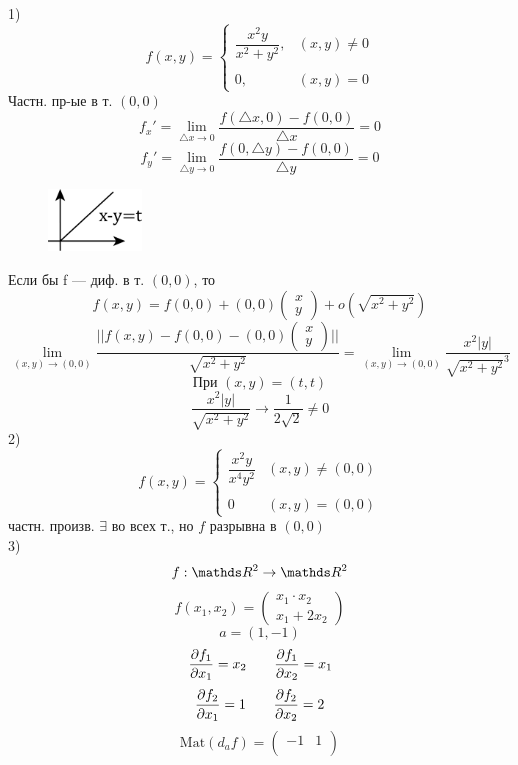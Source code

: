 \documentclass[main]{subfiles}
\begin{document}
	\begin{examples}
		1)
		\[f(x, y) = \begin{cases}
				\dfrac{x^2 y}{x^2 + y^2}, & (x, y) \neq 0 \\
				\\
				0,                       & (x, y) = 0
			\end{cases}\]
		Частн. пр-ые в т. $(0, 0)$
		\[f_x' = \lim_{\triangle x \to 0} \frac{f(\triangle x, 0) - f(0, 0)}{\triangle x} = 0 \]
		\[f_y' = \lim_{\triangle y \to 0} \frac{f(0, \triangle y) - f(0, 0)}{\triangle y} = 0\]
		\begin{figure}[H]
			\includegraphics[width = 2.5cm]{pics/4_1}
			\centering
		\end{figure}
		Если бы f --- диф. в т. $(0, 0)$, то
		\[f(x, y) = f(0, 0) + (0, 0) \begin{pmatrix}
				x \\
				y
			\end{pmatrix}
			+ o(\sqrt{x^2 + y^2})
		\]
		\[\lim_{(x, y) \to (0, 0)} \frac{||f(x, y) - f(0, 0) - (0, 0) \begin{pmatrix}
					x \\
					y
				\end{pmatrix}||}{\sqrt{x^2 + y^2}} =
			\lim_{(x, y) \to (0, 0)} \frac{x^2|y|}{ \sqrt{x^2 + y^2}^3} \]
		\[\text{При } (x, y) = (t, t)\]
		\[\frac{x^2|y|}{\sqrt{x^2 + y^2}} \to \frac{1}{2\sqrt{2}} \neq 0\]
		2)
		\[f(x, y) = \begin{cases}
				\dfrac{x^2 y}{x^4 y^2} & (x, y) \neq (0, 0) \\
				\\
				0 & (x, y) = (0, 0)
			\end{cases}\]
		частн. произв. $\exists$ во всех т., но $f$ разрывна в $(0, 0)$\\
		3)
		\[f: \R^2 \to \R^2\]
		\[f(x_1, x_2) = \begin{pmatrix}
				x_1 \cdot x_2 \\
				x_1 + 2x_2
			\end{pmatrix}\]
		\[a = (1, -1)\]
		\[\frac{\partial f_1}{\partial x_1} = x_2 \quad\quad \frac{\partial f_1}{\partial x_2} = x_1\]
		\[\frac{\partial f_2}{\partial x_1} = 1 \quad\quad \frac{\partial f_2}{\partial x_2} = 2\]
		\[\text{Mat}(d_a f) = \begin{pmatrix}
				-1 & 1 \\

\end{pmatrix}\]
\end{examples}
\end{document}
